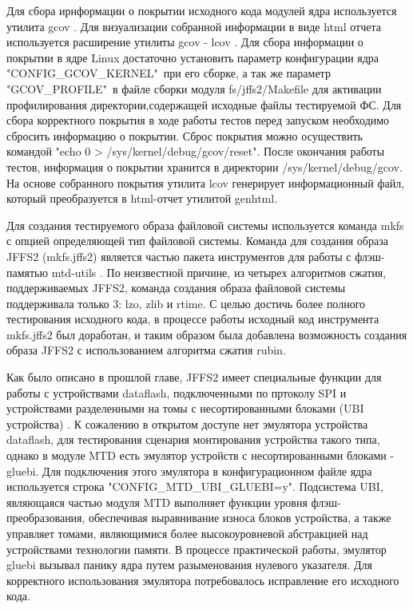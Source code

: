 Для сбора ирнформации о покрытии исходного кода модулей ядра используется утилита gcov \cite{gcov}. Для визуализации собранной информации в виде html отчета используется расширение утилиты gcov - lcov \cite{lcov}. Для сбора информации о покрытии в ядре Linux достаточно установить параметр конфигурации ядра "CONFIG\_GCOV\_KERNEL"\ при его сборке, а так же параметр "GCOV\_PROFILE"\ в файле сборки модуля fs/jffs2/Makefile для активации профилирования директории,содержащей исходные файлы тестируемой ФС. Для сбора корректного покрытия в ходе работы тестов перед запуском необходимо сбросить информацию о покрытии. Сброс покрытия можно осуществить командой  "echo 0 > /sys/kernel/debug/gcov/reset". После окончания работы тестов, информация о покрытии хранится в директории /sys/kernel/debug/gcov. На основе собранного покрытия утилита lcov генерирует информационный файл, который преобразуется в html-отчет утилитой genhtml.

Для создания тестируемого образа файловой системы используется команда mkfs с опцией определяющей тип файловой системы. Команда для создания образа JFFS2 (mkfs.jffs2) является частью пакета инструментов для работы с флэш-памятью mtd-utils \cite{mtd-utils}. По неизвестной причине, из четырех алгоритмов сжатия, поддерживаемых JFFS2, команда создания образа файловой системы поддерживала только 3: lzo, zlib и rtime. С целью достичь более полного тестирования исходного кода, в процессе работы исходный код инструмента mkfs.jffs2 был доработан, и таким образом была добавлена возможность создания образа JFFS2 с использованием алгоритма сжатия rubin.

Как было описано в прошлой главе, JFFS2 имеет специальные функции для работы с устройствами dataflash, подключенными по пртоколу SPI и устройствами разделенными на томы с несортированными блоками (UBI устройства) \cite{ubi}. К сожалению в открытом доступе нет эмулятора устройства dataflash, для тестирования сценария монтирования устройства такого типа, однако в модуле MTD есть эмулятор устройств с несортированными блоками - gluebi. Для подключения этого эмулятора в конфигурационном файле ядра используется строка "CONFIG\_MTD\_UBI\_GLUEBI=y". Подсистема UBI, являющаяся частью модуля MTD выполняет функции уровня флэш-преобразования, обеспечивая выравнивание износа блоков устройства, а также управляет томами, являющимися более высокоуровневой абстракцией над устройствами технологии памяти. В процессе практической работы, эмулятор gluebi вызывал панику ядра путем разыменования нулевого указателя. Для корректного использования эмулятора потребовалось исправление его исходного кода.

